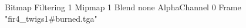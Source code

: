 {Bitmap
	{Filtering 1}
	{Mipmap 1}
	{Blend none}
	{AlphaChannel 0}
	{Frame "fir4_twigs1#burned.tga"}
}

